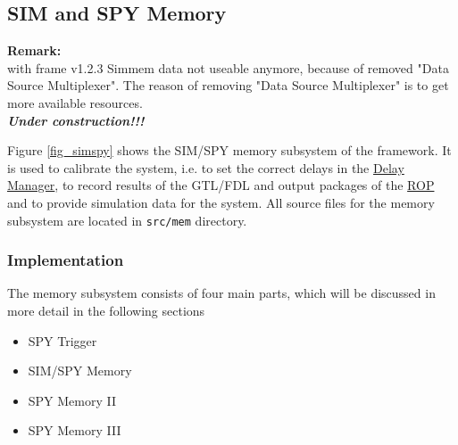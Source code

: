 % 
% 
%
%

\subsection{SIM and SPY Memory}\label{sec:sim-spy}
\textbf{Remark:}\\
with frame v1.2.3 Simmem data not useable anymore, because of removed "Data Source Multiplexer".
The reason of removing "Data Source Multiplexer" is to get more available resources.\\

\textbf{\textit{Under construction!!!}}

Figure \ref{fig_simspy} shows the SIM/SPY memory subsystem of the framework. 
It is used to calibrate the system, i.e. to set the correct delays in the \hyperref[sec_dm]{Delay Manager}, to record results of the GTL/FDL and 
output packages of the \hyperref[sec_rop]{ROP} and to provide simulation data for the system.
All source files for the memory subsystem are located in \texttt{src/mem} directory. 

\subsubsection{Implementation}\label{sec:sim_spy_impl}
The memory subsystem consists of four main parts, which will be discussed in more detail in the following sections

\begin{itemize}
\item SPY Trigger
\item SIM/SPY Memory
\item SPY Memory II
\item SPY Memory III
\end{itemize}

